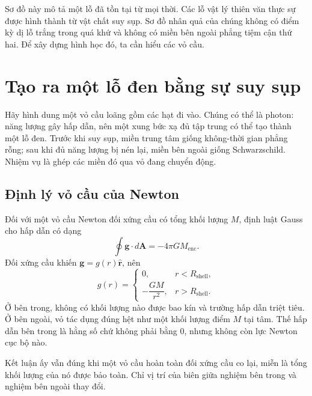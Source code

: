Sơ đồ này mô tả một lỗ đã tồn tại từ mọi thời. Các lỗ vật lý thiên văn thực sự được hình thành từ vật chất suy sụp. Sơ đồ nhân quả của chúng không có điểm kỳ dị lỗ trắng trong quá khứ và không có miền bên ngoài phẳng tiệm cận thứ hai. Để xây dựng hình học đó, ta cần hiểu các vỏ cầu.

\section{Tạo ra một lỗ đen bằng sự suy sụp}

Hãy hình dung một vỏ cầu loãng gồm các hạt đi vào. Chúng có thể là photon: năng lượng gây hấp dẫn, nên một xung bức xạ đủ tập trung có thể tạo thành một lỗ đen. Trước khi suy sụp, miền trung tâm giống không-thời gian phẳng rỗng; sau khi đủ năng lượng bị nén lại, miền bên ngoài giống Schwarzschild. Nhiệm vụ là ghép các miền đó qua vỏ đang chuyển động.

\subsection{Định lý vỏ cầu của Newton}

Đối với một vỏ cầu Newton đối xứng cầu có tổng khối lượng \(M\), định luật Gauss cho hấp dẫn có dạng
\begin{equation}
\oint \mathbf{g}\cdot d\mathbf{A}=-4\pi G M_{\mathrm{enc}}.
\label{eq:l04-gauss-gravity}
\end{equation}
Đối xứng cầu khiến \(\mathbf{g}=g(r)\hat{\mathbf r}\), nên
\begin{equation}
g(r)=
\begin{cases}
0, & r<R_{\mathrm{shell}},\\[4pt]
-\dfrac{GM}{r^2}, & r>R_{\mathrm{shell}}.
\end{cases}
\label{eq:l04-shell-field}
\end{equation}
Ở bên trong, không có khối lượng nào được bao kín và trường hấp dẫn triệt tiêu. Ở bên ngoài, vỏ tác dụng đúng hệt như một khối lượng điểm \(M\) tại tâm. Thế hấp dẫn bên trong là hằng số chứ không phải bằng 0, nhưng không còn lực Newton cục bộ nào.

Kết luận ấy vẫn đúng khi một vỏ cầu hoàn toàn đối xứng cầu co lại, miễn là tổng khối lượng của nó được bảo toàn. Chỉ vị trí của biên giữa nghiệm bên trong và nghiệm bên ngoài thay đổi.

